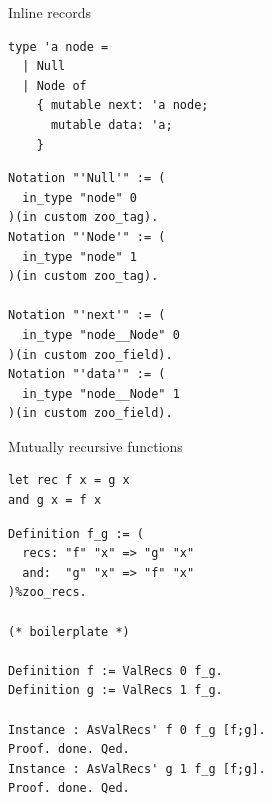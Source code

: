 \begin{frame}[fragile]{Inline records}
\begin{minipage}{0.49\textwidth}
  \begin{verbatim}
type 'a node =
  | Null
  | Node of
    { mutable next: 'a node;
      mutable data: 'a;
    }
  \end{verbatim}
\end{minipage}
\begin{minipage}{0.5\textwidth}
  \begin{verbatim}
Notation "'Null'" := (
  in_type "node" 0
)(in custom zoo_tag).
Notation "'Node'" := (
  in_type "node" 1
)(in custom zoo_tag).

Notation "'next'" := (
  in_type "node__Node" 0
)(in custom zoo_field).
Notation "'data'" := (
  in_type "node__Node" 1
)(in custom zoo_field).
  \end{verbatim}
\end{minipage}
\end{frame}

\begin{frame}[fragile]{Mutually recursive functions}
\begin{minipage}{0.49\textwidth}
  \begin{verbatim}
let rec f x = g x
and g x = f x
  \end{verbatim}
\end{minipage}
\begin{minipage}{0.5\textwidth}
  \begin{verbatim}
Definition f_g := (
  recs: "f" "x" => "g" "x"
  and:  "g" "x" => "f" "x"
)%zoo_recs.

(* boilerplate *)

Definition f := ValRecs 0 f_g.
Definition g := ValRecs 1 f_g.

Instance : AsValRecs' f 0 f_g [f;g].
Proof. done. Qed.
Instance : AsValRecs' g 1 f_g [f;g].
Proof. done. Qed.
  \end{verbatim}
\end{minipage}
\end{frame}

